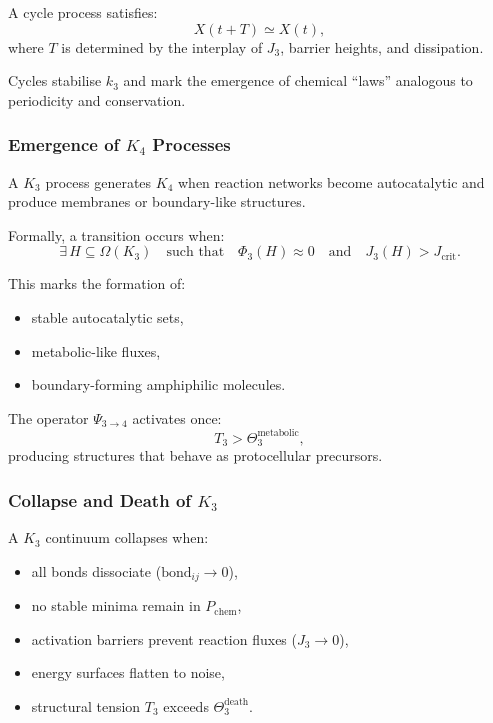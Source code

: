A cycle process satisfies:
\[
X(t + T) \simeq X(t),
\]
where $T$ is determined by the interplay of $J_3$, barrier heights, and 
dissipation.

Cycles stabilise $k_3$ and mark the emergence of chemical ``laws'' analogous 
to periodicity and conservation.

\subsubsection{Emergence of \texorpdfstring{$K_4$}{K_4} Processes}

A $K_3$ process generates $K_4$ when reaction networks become 
autocatalytic and produce membranes or boundary-like structures.

Formally, a transition occurs when:
\[
\exists\, H \subseteq \Omega(K_3) 
\quad \text{such that} \quad
\Phi_3(H) \approx 0 \quad \text{and} \quad
J_3(H) > J_{\text{crit}}.
\]

This marks the formation of:
\begin{itemize}
    \item stable autocatalytic sets,
    \item metabolic-like fluxes,
    \item boundary-forming amphiphilic molecules.
\end{itemize}

The operator $\Psi_{3\to4}$ activates once:
\[
T_3 > \Theta_3^{\text{metabolic}},
\]
producing structures that behave as protocellular precursors.

\subsubsection{Collapse and Death of \texorpdfstring{$K_3$}{K_3}}

A $K_3$ continuum collapses when:

\begin{itemize}
    \item all bonds dissociate ($\text{bond}_{ij} \to 0$),
    \item no stable minima remain in $P_\text{chem}$,
    \item activation barriers prevent reaction fluxes ($J_3\to 0$),
    \item energy surfaces flatten to noise,
    \item structural tension $T_3$ exceeds $\Theta_3^{\text{death}}$.
\end{itemize}

